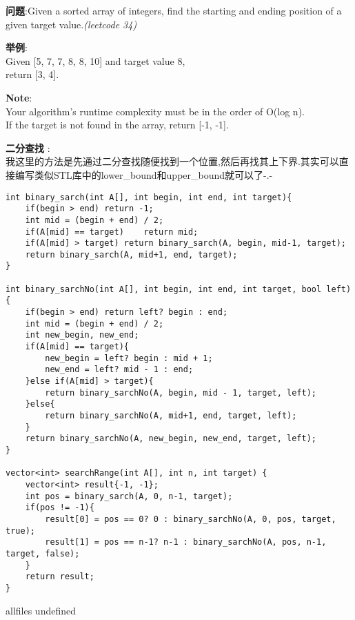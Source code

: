 \documentclass{article}
\begin{document}
\begin{CJK}{UTF8}{gbsn}     %

\else
    
\begin{description}
    \item{\textbf{问题}}:Given a sorted array of integers, find the starting and ending position of a given target value.\textit{(leetcode 34)}
	\item{\textbf{举例}}:\\
Given [5, 7, 7, 8, 8, 10] and target value 8,\\
return [3, 4].\\
	\item{\textbf{Note}}:\\
Your algorithm's runtime complexity must be in the order of O(log n).\\
If the target is not found in the array, return [-1, -1].

    \item{\textbf{二分查找}} : 
    \\我这里的方法是先通过二分查找随便找到一个位置,然后再找其上下界.其实可以直接编写类似STL库中的lower\_bound和upper\_bound就可以了-.-
    \begin{lstlisting}
int binary_sarch(int A[], int begin, int end, int target){
	if(begin > end)	return -1;
	int mid = (begin + end) / 2;
	if(A[mid] == target)	return mid;
	if(A[mid] > target)	return binary_sarch(A, begin, mid-1, target);
	return binary_sarch(A, mid+1, end, target);
}

int binary_sarchNo(int A[], int begin, int end, int target, bool left){
	if(begin > end)	return left? begin : end;
	int mid = (begin + end) / 2;
	int new_begin, new_end;
	if(A[mid] == target){
		new_begin = left? begin : mid + 1;
		new_end = left? mid - 1 : end;
	}else if(A[mid] > target){
		return binary_sarchNo(A, begin, mid - 1, target, left);
	}else{
		return binary_sarchNo(A, mid+1, end, target, left);
	}
	return binary_sarchNo(A, new_begin, new_end, target, left);
}

vector<int> searchRange(int A[], int n, int target) {
	vector<int> result{-1, -1};
	int pos = binary_sarch(A, 0, n-1, target);
	if(pos != -1){
		result[0] = pos == 0? 0 : binary_sarchNo(A, 0, pos, target, true);
		result[1] = pos == n-1? n-1 : binary_sarchNo(A, pos, n-1, target, false);
	}
	return result;
}
    \end{lstlisting}
    \textit{}
\end{description}

\fi

\ifx allfiles undefined
\end{CJK}
\end{document}
